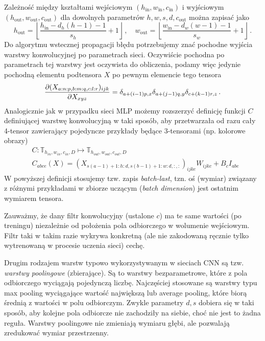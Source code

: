 \documentclass{myclass}
\begin{document}
Zależność między kształtami wejściowym \((h_\text{in},w_\text{in},c_\text{in})\) i wyjściowym
\((h_\text{out},w_\text{out},c_\text{out})\) dla dowolnych parametrów \(h,w,s,d,c_\text{out}\) można
zapisać jako 
\begin{equation*}
    h_\text{out} = \left\lfloor \frac{h_\text{in} - d_h(h-1) - 1}{s_h} + 1\right\rfloor\,,\quad w_\text{out} = \left\lfloor \frac{w_\text{in} - d_w(w-1) - 1}{s_w} + 1\right\rfloor\,.
\end{equation*}
Do algorytmu wstecznej propagacji błędu potrzebujemy znać pochodne wyjścia warstwy konwolucyjnej po
parametrach sieci. Oczywiście pochodna po parametrach tej warstwy jest oczywista do obliczenia,
podamy więc jedynie pochodną elementu podtensora \(X\) po pewnym elemencie tego tensora
\begin{equation*}
    \pdv{(X_{a:n:p,b:m:q,c:l:r})_{ijk}}{X_{xyz}} = \delta_{a+(i-1)p,x}\delta_{a+(j-1)q,y}\delta_{c+(k-1)r,z}\,.
\end{equation*}
Analogicznie jak w przypadku sieci MLP możemy rozszerzyć definicję funkcji \(C\) definiującej
warstwę konwolucyjną w taki sposób, aby przetwarzała od razu cały 4-tensor zawierający pojedyncze
przykłady będące 3-tensorami (np. kolorowe obrazy)
\begin{equation*}
    \begin{split}
        &C: \mathbb{T}_{h_{in}, w_{in}, c_{in}, D} \mapsto \mathbb{T}_{h_{out}, w_{out}, c_{out}, D}\\
        &C_{abce}(X) = (X_{s(a-1)+1:h:d,s(b-1)+1:w:d,:,:})_{ijke}W_{ijkc} + B_c I_{abe}
    \end{split}
\end{equation*}
W powyższej definicji stosujemy tzw. zapis \textit{batch-last}, tzn. oś (wymiar) związany z różnymi
przykładami w zbiorze uczącym (\textit{batch dimension}) jest ostatnim wymiarem tensora.

Zauważmy, że dany filtr konwolucyjny (ustalone \(c\)) ma te same wartości (po treningu) niezależnie
od położenia pola odbiorczego w wolumenie wejściowym. Filtr taki w takim razie wykrywa konkretną
(ale nie zakodowaną ręcznie tylko wytrenowaną w procesie uczenia sieci) cechę.

Drugim rodzajem warstw typowo wykorzystywanym w sieciach CNN są tzw. \textit{warstwy poolingowe}
(zbierające). Są to warstwy bezparametrowe, które z pola odbiorczego wyciągają pojedynczą liczbę.
Najczęściej stosowane są warstwy typu max pooling wyciągające wartość największą lub average
pooling, które biorą średnią z wartości w polu odbiorczym. Zwykle parametry \(d, s\) dobiera się w
taki sposób, aby kolejne pola odbiorcze nie zachodziły na siebie, choć nie jest to żadna reguła.
Warstwy poolingowe nie zmieniają wymiaru głębi, ale pozwalają zredukować wymiar przestrzenny.
\end{document}
